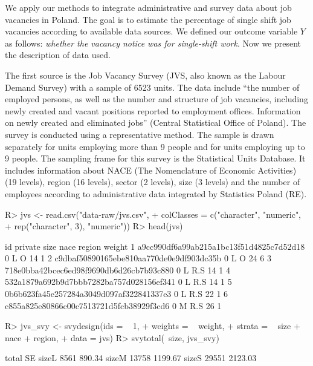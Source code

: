 \documentclass[
]{jss}
\begin{document}
We apply our methods to integrate administrative and survey data about
job vacancies in Poland. The goal is to estimate the percentage of
single shift job vacancies according to available data sources. We
defined our outcome variable \(Y\) as follows:
\textit{whether the vacancy notice was for single-shift work}. Now we
present the description of data used.

The first source is the Job Vacancy Survey (JVS, also known as the
Labour Demand Survey) with a sample of 6523 units. The data include
``the number of employed persons, as well as the number and structure of
job vacancies, including newly created and vacant positions reported to
employment offices. Information on newly created and eliminated jobs''
(Central Statistical Office of Poland). The survey is conducted using a
representative method. The sample is drawn separately for units
employing more than 9 people and for units employing up to 9 people. The
sampling frame for this survey is the Statistical Units Database. It
includes information about NACE (The Nomenclature of Economic
Activities) (19 levels), region (16 levels), sector (2 levels), size (3
levels) and the number of employees according to administrative data
integrated by Statistics Poland (RE).

\begin{CodeChunk}
\begin{CodeInput}
R> jvs <- read.csv("data-raw/jvs.csv",
+                   colClasses = c("character", "numeric",
+                                  rep("character", 3), "numeric"))
R> head(jvs)
\end{CodeInput}
\begin{CodeOutput}
                                        id private size nace region weight
1 a9cc990df6a99ab215a1bc13f51d4825c7d52d18       0    L    O     14      1
2 c9dbaf50890165ebe810aa770de0e9df903dc35b       0    L    O     24      6
3 718e0bba42bcec6ed98f9690db6d26cb7b93c880       0    L  R.S     14      1
4 532a1879a692b9d7bbb7282ba757d028156ef341       0    L  R.S     14      1
5 0b6b623fa45e257284a3049d097af322841337e3       0    L  R.S     22      1
6 c855a825e80866c00c7513721d5fcb38929f3cd6       0    M  R.S     26      1
\end{CodeOutput}
\end{CodeChunk}

\begin{CodeChunk}
\begin{CodeInput}
R> jvs_svy <- svydesign(ids = ~ 1, 
+                      weights = ~ weight,
+                      strata = ~ size + nace + region,
+                      data = jvs)
R> svytotal(~size, jvs_svy)
\end{CodeInput}
\begin{CodeOutput}
      total      SE
sizeL  8561  890.34
sizeM 13758 1199.67
sizeS 29551 2123.03
\end{CodeOutput}
\end{CodeChunk}
\end{document}
